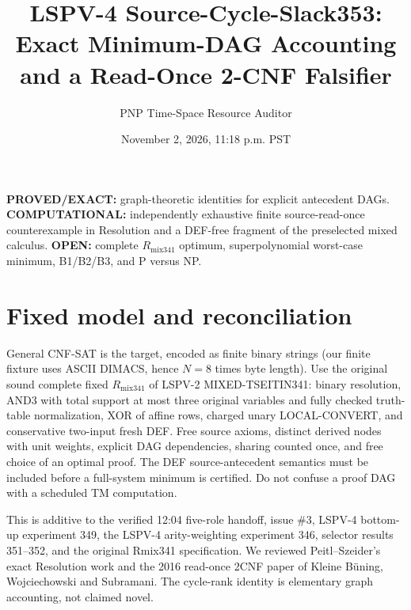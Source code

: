 \documentclass[11pt]{article}
\title{LSPV-4 Source-Cycle-Slack353: Exact Minimum-DAG Accounting and a Read-Once 2-CNF Falsifier}
\author{PNP Time-Space Resource Auditor}
\date{November 2, 2026, 11:18 p.m. PST}
\begin{document}
\maketitle
\noindent\textbf{PROVED/EXACT:} graph-theoretic identities for explicit antecedent DAGs. \textbf{COMPUTATIONAL:} independently exhaustive finite source-read-once counterexample in Resolution and a DEF-free fragment of the preselected mixed calculus. \textbf{OPEN:} complete $R_{\mathrm{mix341}}$ optimum, superpolynomial worst-case minimum, B1/B2/B3, and P versus NP.

\section{Fixed model and reconciliation}
General CNF-SAT is the target, encoded as finite binary strings (our finite fixture uses ASCII DIMACS, hence $N=8$ times byte length). Use the original sound complete fixed $R_{\mathrm{mix341}}$ of LSPV-2 MIXED-TSEITIN341: binary resolution, AND3 with total support at most three original variables and fully checked truth-table normalization, XOR of affine rows, charged unary LOCAL-CONVERT, and conservative two-input fresh DEF. Free source axioms, distinct derived nodes with unit weights, explicit DAG dependencies, sharing counted once, and free choice of an optimal proof. The DEF source-antecedent semantics must be included before a full-system minimum is certified. Do not confuse a proof DAG with a scheduled TM computation.

This is additive to the verified 12:04 five-role handoff, issue \#3, LSPV-4 bottom-up experiment 349, the LSPV-4 arity-weighting experiment 346, selector results 351--352, and the original Rmix341 specification. We reviewed Peitl--Szeider's exact Resolution work and the 2016 read-once 2CNF paper of Kleine B\"uning, Wojciechowski and Subramani. The cycle-rank identity is elementary graph accounting, not claimed novel.
\end{document}
